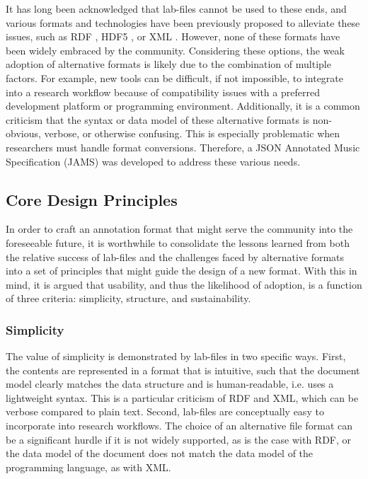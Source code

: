 \noindent It has long been acknowledged that lab-files cannot be used to these ends, and various formats and technologies have been previously proposed to alleviate these issues, such as RDF \cite{cannam2006sonic}, HDF5 \cite{bertin2011million}, or XML \cite{mckay2005ace}.
However, none of these formats have been widely embraced by the community.
Considering these options, the weak adoption of alternative formats is likely due to the combination of multiple factors.
For example, new tools can be difficult, if not impossible, to integrate into a research workflow because of compatibility issues with a preferred development platform or programming environment.
Additionally, it is a common criticism that the syntax or data model of these alternative formats is non-obvious, verbose, or otherwise confusing.
This is especially problematic when researchers must handle format conversions.
Therefore, a JSON Annotated Music Specification (JAMS) was developed to address these various needs.


\subsection{Core Design Principles}
\label{subsec:design}

In order to craft an annotation format that might serve the community into the foreseeable future, it is worthwhile to consolidate the lessons learned from both the relative success of lab-files and the challenges faced by alternative formats into a set of principles that might guide the design of a new format.
With this in mind, it is argued that usability, and thus the likelihood of adoption, is a function of three criteria:
simplicity, structure, and sustainability.

\subsubsection{Simplicity}
\label{subsubsec:simplicity}
The value of simplicity is demonstrated by lab-files in two specific ways.
First, the contents are represented in a format that is intuitive, such that the document model clearly matches the data structure and is human-readable, i.e. uses a lightweight syntax.
This is a particular criticism of RDF and XML, which can be verbose compared to plain text.
Second, lab-files are conceptually easy to incorporate into research workflows.
The choice of an alternative file format can be a significant hurdle if it is not widely supported, as is the case with RDF, or the data model of the document does not match the data model of the programming language, as with XML.

